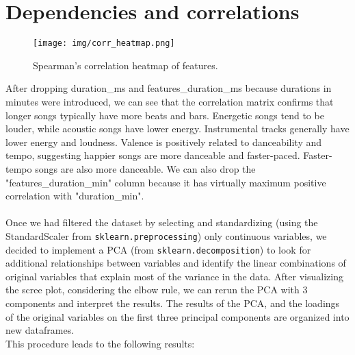 \section{Dependencies and correlations}
\begin{figure}[H]
    \centering
    \texttt{[image: img/corr\_heatmap.png]}
    \caption{Spearman's correlation heatmap of features.}
    \label{fig:enter-label}
\end{figure}
After dropping duration\_ms and features\_duration\_ms because durations in minutes were introduced, we can see that the correlation matrix confirms that longer songs typically have more beats and bars. Energetic songs tend to be louder, while acoustic songs have lower energy. Instrumental tracks generally have lower energy and loudness. Valence is positively related to danceability and tempo, suggesting happier songs are more danceable and faster-paced. Faster-tempo songs are also more danceable. We can also drop the "features\_duration\_min" column because it has virtually maximum positive correlation with "duration\_min".\\
\\
Once we had filtered the dataset by selecting and standardizing (using the StandardScaler from \texttt{sklearn.preprocessing}) only continuous variables, we decided to implement a PCA (from \texttt{sklearn.decomposition}) to look for additional relationships between variables and identify the linear combinations of original variables that explain most of the variance in the data. After visualizing the scree plot, considering the elbow rule, we can rerun the PCA with 3 components and interpret the results. The results of the PCA, and the loadings of the original variables on the first three principal components are organized into new dataframes. \\
This procedure leads to the following results:

